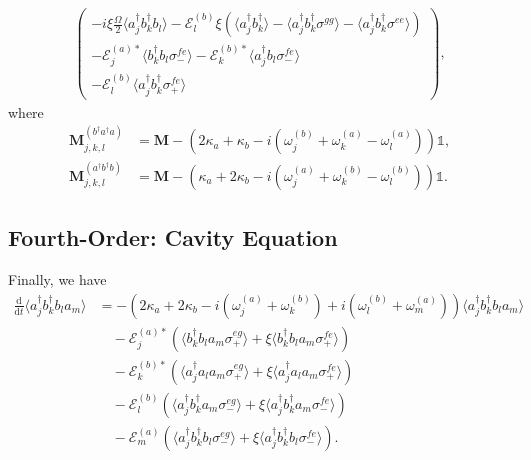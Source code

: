 \documentclass{article}
\newcommand{\ddt}[1][]{\frac{\mathrm{d} #1}{\mathrm{d}t}}
\begin{document}
\begin{subequations}
\begin{align}
\begin{pmatrix}
			-i \xi \frac{\Omega}{2} \langle a^{\dagger}_{j} b^{\dagger}_{k} b_{l} \rangle	- \mathcal{E}_{l}^{(b)} \xi \left( \langle a^{\dagger}_{j} b^{\dagger}_{k} \rangle - \langle a^{\dagger}_{j} b^{\dagger}_{k} \sigma^{gg} \rangle - \langle a^{\dagger}_{j} b^{\dagger}_{k} \sigma^{ee} \rangle \right) \\
			-\mathcal{E}_{j}^{(a) *} \langle b^{\dagger}_{k} b_{l} \sigma^{fe}_{-} \rangle - \mathcal{E}_{k}^{(b) *} \langle a^{\dagger}_{j} b_{l} \sigma^{fe}_{-} \rangle \\
			-\mathcal{E}_{l}^{(b)} \langle a^{\dagger}_{j} b^{\dagger}_{k} \sigma^{fe}_{+} \rangle
		\end{pmatrix},
	\end{align}
\end{subequations}
where
\begin{subequations}
	\begin{align}
		\bm{M}_{j, k, l}^{(b^{\dagger} a^{\dagger} a)} &= \bm{M} - \left( 2 \kappa_{a} + \kappa_{b} - i \left( \omega_{j}^{(b)} + \omega_{k}^{(a)} - \omega_{l}^{(a)} \right) \right) \mathbb{1}, \\
		\bm{M}_{j, k, l}^{(a^{\dagger} b^{\dagger} b)} &= \bm{M} - \left( \kappa_{a} + 2 \kappa_{b} - i \left( \omega_{j}^{(a)} + \omega_{k}^{(b)} - \omega_{l}^{(b)} \right) \right) \mathbb{1}.
	\end{align}
\end{subequations}

\subsection{Fourth-Order: Cavity Equation}

Finally, we have
\begin{align}
	\ddt \langle a^{\dagger}_{j} b^{\dagger}_{k} b_{l} a_{m} \rangle &= -\left( 2 \kappa_{a} + 2 \kappa_{b} - i \left( \omega_{j}^{(a)} + \omega_{k}^{(b)} \right) + i \left( \omega_{l}^{(b)} + \omega_{m}^{(a)} \right) \right) \langle a^{\dagger}_{j} b^{\dagger}_{k} b_{l} a_{m} \rangle \nonumber \\
	&\quad - \mathcal{E}_{j}^{(a) *} \left( \langle b^{\dagger}_{k} b_{l} a_{m} \sigma^{eg}_{+} \rangle + \xi \langle b^{\dagger}_{k} b_{l} a_{m} \sigma^{fe}_{+} \rangle \right) \nonumber \\
	&\quad - \mathcal{E}_{k}^{(b) *} \left( \langle a^{\dagger}_{j} a_{l} a_{m} \sigma^{eg}_{+} \rangle + \xi \langle a^{\dagger}_{j} a_{l} a_{m} \sigma^{fe}_{+} \rangle \right) \nonumber \\
	&\quad - \mathcal{E}_{l}^{(b)} \left( \langle a^{\dagger}_{j} b^{\dagger}_{k} a_{m} \sigma^{eg}_{-} \rangle + \xi \langle a^{\dagger}_{j} b^{\dagger}_{k} a_{m} \sigma^{fe}_{-} \rangle \right) \nonumber \\
	&\quad - \mathcal{E}_{m}^{(a)} \left( \langle a^{\dagger}_{j} b^{\dagger}_{k} b_{l} \sigma^{eg}_{-} \rangle + \xi \langle a^{\dagger}_{j} b^{\dagger}_{k} b_{l} \sigma^{fe}_{-} \rangle \right).
\end{align}
\end{document}
